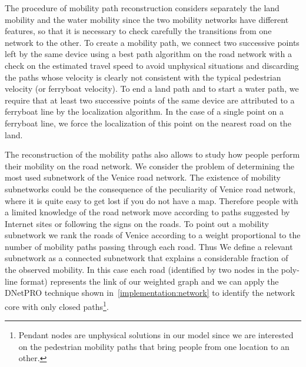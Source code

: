 \documentclass{standalone}
\begin{document}
The procedure of mobility path reconstruction considers separately the land mobility and the water mobility since the two mobility networks have different features, so that it is necessary to check carefully the transitions from one network to the other.
To create a mobility path, we connect two successive points left by the same device using a best path algorithm on the road network with a check on the estimated travel speed to avoid unphysical situations and discarding the paths whose velocity is clearly not consistent with
the typical pedestrian velocity (or ferryboat velocity).
To end a land path and to start a water path, we require that at least two successive points of the same device are attributed to a ferryboat line by the localization algorithm.
In the case of a single point on a ferryboat line, we force the localization of this point on the nearest road on the land.

The reconstruction of the mobility paths also allows to study how people perform their mobility on the road network.
We consider the problem of determining the most used subnetwork of the Venice road network.
The existence of mobility subnetworks could be the consequence of the peculiarity of Venice road network, where it is quite easy to get lost
if you do not have a map.
Therefore people with a limited knowledge of the road network move according to paths suggested by Internet sites or following the signs on the roads.
To point out a mobility subnetwork we rank the roads of Venice according to a weight proportional to the number of mobility paths passing through each road.
Thus We define a relevant subnetwork as a connected subnetwork that explains a considerable fraction of the observed mobility.
In this case each road (identified by two nodes in the poly-line format) represents the link of our weighted graph and we can apply the DNetPRO technique shown in~\ref{implementation:network} to identify the network core with only closed paths\footnote{
  Pendant nodes are unphysical solutions in our model since we are interested on the pedestrian mobility paths that bring people from one location to an other.
}.

\end{document}
